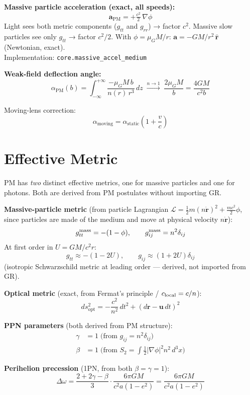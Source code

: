 \documentclass[10pt,twocolumn]{article}
\begin{document}
\textbf{Massive particle acceleration (exact, all speeds):}
\[
  \boxed{\mathbf a_{\mathrm{PM}} = +\tfrac{c^2}{2}\,\nabla\phi}
\]
Light sees both metric components ($g_{tt}$ and $g_{rr}$) → factor $c^2$.
Massive slow particles see only $g_{tt}$ → factor $c^2/2$.  With
$\phi = \mu_G M/r$: $\mathbf a = -GM/r^2\,\hat{\mathbf r}$ (Newtonian, exact). \\
Implementation: \texttt{core.massive\_accel\_medium}

\textbf{Weak-field deflection angle:}
\[
  \alpha_{\mathrm{PM}}(b) = \int_{-\infty}^{+\infty}
    \frac{-\mu_G M\,b}{n(r)\,r^3}\,dz
  \;\xrightarrow[]{n\to1}\;
  \frac{2\mu_G M}{b} = \frac{4GM}{c^2 b}
\]

Moving-lens correction:
\[
  \alpha_{\mathrm{moving}} = \alpha_{\mathrm{static}}\!\left(1 + \frac{v}{c}\right)
\]

\section{Effective Metric}

PM has \emph{two} distinct effective metrics, one for massive particles and one
for photons.  Both are derived from PM postulates without importing GR.

\textbf{Massive-particle metric} (from particle Lagrangian
$\mathcal{L}=\tfrac{1}{2}m(n\dot{\mathbf r})^2+\tfrac{mc^2}{2}\phi$,
since particles are made of the medium and move at physical velocity $n\dot{\mathbf r}$):
\[
  g_{tt}^{\rm mass} = -(1-\phi),
  \qquad
  g_{ij}^{\rm mass} = n^2 \delta_{ij}
\]
At first order in $U=GM/c^2r$:
\[
  g_{tt} \approx -(1-2U), \qquad g_{ij} \approx (1+2U)\delta_{ij}
\]
(isotropic Schwarzschild metric at leading order — derived, not imported from GR).

\textbf{Optical metric} (exact, from Fermat's principle / $c_{\rm local}=c/n$):
\[
  ds_{\mathrm{opt}}^2
  = -\frac{c^2}{n^2}\,dt^2 + (d\mathbf r - \mathbf u\,dt)^2
\]

\textbf{PPN parameters} (both derived from PM structure):
\begin{align*}
  \gamma &= 1 \;\text{(from $g_{ij}=n^2\delta_{ij}$)} \\
  \beta  &= 1 \;\text{(from $S_2=\int\tfrac{1}{2}|\nabla\phi|^2 n^2\,d^3x$)}
\end{align*}

\textbf{Perihelion precession} (1PN, from both $\beta=\gamma=1$):
\[
  \Delta\omega = \frac{2+2\gamma-\beta}{3}\cdot\frac{6\pi GM}{c^2 a(1-e^2)}
  = \frac{6\pi GM}{c^2 a(1-e^2)}
\]
\end{document}
